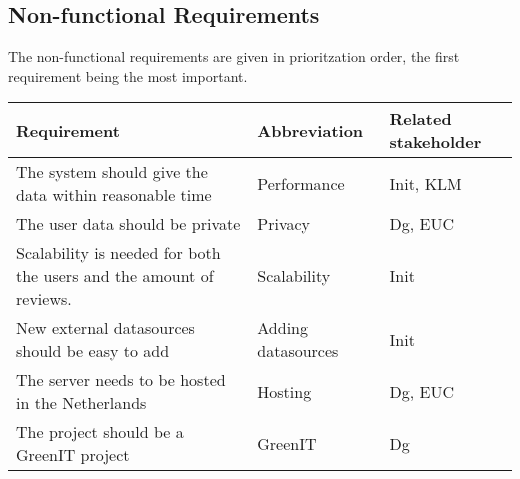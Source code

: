 \subsection*{Non-functional Requirements}
The non-functional requirements are given in prioritzation order, the first requirement being the most important. 

\begin{longtable}{| p{10cm}| l | l |}
\hline
\textbf{Requirement} & \textbf{Abbreviation} & \textbf{Related stakeholder} \\ \hline
The system should give the data within reasonable time & Performance & Init, KLM \\ \hline
The user data should be private & Privacy & Dg, EUC \\ \hline
Scalability is needed for both the users and the amount of reviews.& Scalability & Init \\ \hline
New external datasources should be easy to add & Adding datasources & Init \\ \hline
The server needs to be hosted in the Netherlands & Hosting & Dg, EUC \\ \hline
The project should be a GreenIT project & GreenIT & Dg\\ \hline
\end{longtable}

